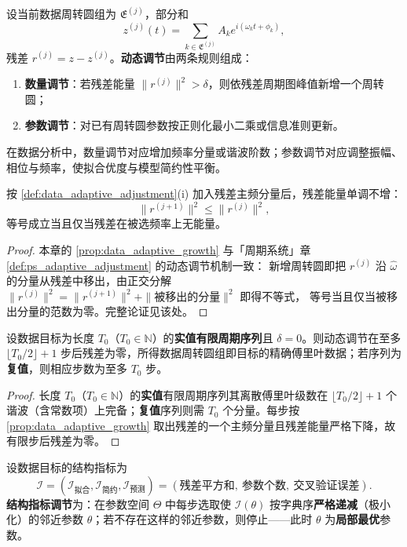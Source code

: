 \begin{definition}[数据周转圆组的动态调节]\label{def:data_adaptive_adjustment}
设当前数据周转圆组为 $\mathfrak E^{(j)}$，部分和
\[
z^{(j)}(t)=\sum_{k\in\mathfrak E^{(j)}}A_k e^{i(\omega_k t+\phi_k)},
\]
残差 $r^{(j)}=z-z^{(j)}$。\textbf{动态调节}由两条规则组成：
\begin{enumerate}[label=(\roman*)]
    \item \textbf{数量调节}：若残差能量 $\|r^{(j)}\|^2>\delta$，则依残差周期图峰值新增一个周转圆；
    \item \textbf{参数调节}：对已有周转圆参数按正则化最小二乘或信息准则更新。
\end{enumerate}
在数据分析中，数量调节对应增加频率分量或谐波阶数；参数调节对应调整振幅、相位与频率，使拟合优度与模型简约性平衡。
\end{definition}

\begin{proposition}[数量调节的单调性]\label{prop:data_adaptive_growth}
按 \cref{def:data_adaptive_adjustment}(i) 加入残差主频分量后，残差能量单调不增：
\[
\|r^{(j+1)}\|^2\le\|r^{(j)}\|^2,
\]
等号成立当且仅当残差在被选频率上无能量。
\end{proposition}

\begin{proof}
本章的 \cref{prop:data_adaptive_growth} 与「周期系统」章 \cref{def:ps_adaptive_adjustment} 的动态调节机制一致：
新增周转圆即把 $r^{(j)}$ 沿 $\hat\omega$ 的分量从残差中移出，由正交分解
$\|r^{(j)}\|^2=\|r^{(j+1)}\|^2+\|\text{被移出的分量}\|^2$ 即得不等式，
等号当且仅当被移出分量的范数为零。完整论证见该处。
\end{proof}

\begin{theorem}[动态调节的收敛性]\label{thm:data_adaptive_convergence}
设数据目标为长度 $T_0$（$T_0\in\mathbb N$）的\textbf{实值有限周期序列}且 $\delta=0$。则动态调节在至多 $\lfloor T_0/2\rfloor+1$ 步后残差为零，所得数据周转圆组即目标的精确傅里叶数据；若序列为\textbf{复值}，则相应步数为至多 $T_0$ 步。
\end{theorem}

\begin{proof}
长度 $T_0$（$T_0\in\mathbb N$）的\textbf{实值}有限周期序列其离散傅里叶级数在 $\lfloor T_0/2\rfloor+1$ 个谐波（含常数项）上完备；\textbf{复值}序列则需 $T_0$ 个分量。每步按 \cref{prop:data_adaptive_growth} 取出残差的一个主频分量且残差能量严格下降，故有限步后残差为零。
\end{proof}

\begin{definition}[结构指标调节]\label{def:data_structure_metric_adjustment}
设数据目标的结构指标为
\[
\mathcal I=(\mathcal I_{\text{拟合}},\mathcal I_{\text{简约}},\mathcal I_{\text{预测}})
=(\text{残差平方和},\ \text{参数个数},\ \text{交叉验证误差}).
\]
\textbf{结构指标调节}为：在参数空间 $\Theta$ 中每步选取使 $\mathcal I(\theta)$ 按字典序\textbf{严格递减}（极小化）的邻近参数 $\theta$；若不存在这样的邻近参数，则停止——此时 $\theta$ 为\textbf{局部最优}参数。
\end{definition}

